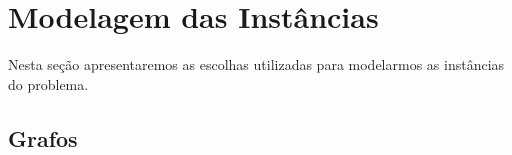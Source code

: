 \documentclass[12pt]{elsarticle}
\begin{document}
    
    
    
    
	
    
    
    \section{Modelagem das Instâncias}
    
    Nesta seção apresentaremos as escolhas utilizadas para modelarmos as instâncias do problema.
    
    \subsection{Grafos}
    
\end{document}
